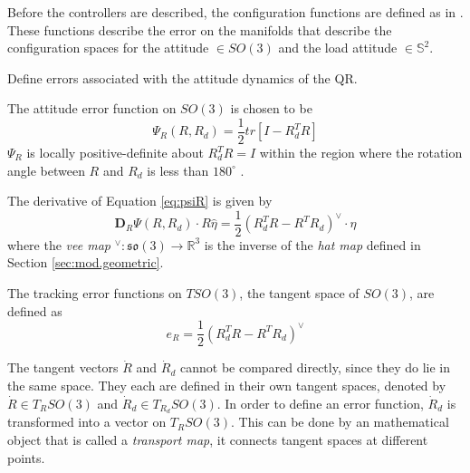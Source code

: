 Before the controllers are described, the configuration functions are defined as in \cite{Bullo2005}. 
These functions describe the error on the manifolds that describe the configuration spaces for the  attitude $ \in SO(3) $ and the load attitude $ \in \mathbb{S}^2 $.

Define errors associated with the attitude dynamics of the QR. 


The  attitude error function on $ SO(3) $ is chosen to be \cite{Lee2010}
\begin{equation}\label{eq:psiR}
\Psi_R(R,R_d)=\frac{1}{2}tr\left[I-R_d^TR\right]
\end{equation}
$ \Psi_R $ is locally positive-definite about $ R^T_dR=I $ within the region where the rotation angle between $ R $ and $ R_d $ is less than $ 180^\circ $ \cite{Bullo2005}. 


The derivative of Equation \ref{eq:psiR} is given by 
\begin{equation}\label{key}
\mathbf{D}_R\Psi(R,R_d)\cdot R\hat{\eta}=\frac{1}{2}(R^T_dR-R^TR_d)^\vee\cdot\eta
\end{equation}
where the \textit{vee map} $ ^\vee:\mathfrak{so}(3)\rightarrow\mathbb{R}^3 $ is the inverse of the \textit{hat map} defined in Section \ref{sec:mod.geometric}.

The tracking error functions on $ TSO(3) $, the tangent space of $ SO(3) $, are defined as
\begin{equation}\label{key}
e_R=\frac{1}{2}(R_d^TR-R^TR_d)^\vee
\end{equation}


The tangent vectors $ \dot{R} $ and $ \dot{R}_d $ cannot be compared directly, since they do lie in the same space. They each are defined in their own tangent spaces, denoted by $ \dot{R} \in T_RSO(3)$ and $ \dot{R}_d \in T_{R_d}SO(3)$. In order to define an error function, $ \dot{R}_d $ is transformed into a vector on $ T_RSO(3) $. This can be done by an mathematical object that is called a \textit{transport map}, it connects tangent spaces at different points.


